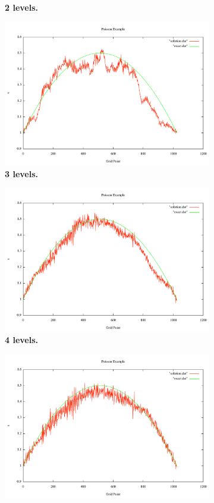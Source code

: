 \documentclass[note]{TechNote}
\begin{document}
\begin{figure}[h!]
\begin{subfigure}[b]{0.32\textwidth}
    \caption{\textbf{2 levels.}}
  \end{subfigure}
  \begin{subfigure}[b]{0.32\textwidth}
    \includegraphics[width=\textwidth]{7_sec_3_level.pdf}
    \caption{\textbf{3 levels.}}
  \end{subfigure}
  \begin{subfigure}[b]{0.32\textwidth}
    \includegraphics[width=\textwidth]{7_sec_4_level.pdf}
    \caption{\textbf{4 levels.}}
  \end{subfigure}
  \begin{subfigure}[b]{0.32\textwidth}
    \includegraphics[width=\textwidth]{7_sec_5_level.pdf}

\end{subfigure}
\end{figure}
\end{document}
